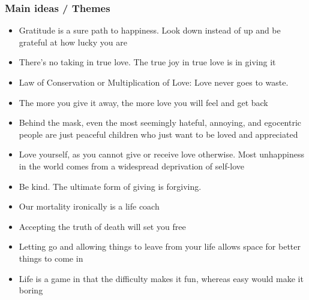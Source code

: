 \begin{frame}[fragile]\frametitle{Main ideas / Themes}

\begin{itemize}
\item Gratitude is a sure path to happiness. Look down instead of up and be grateful at how lucky you are
\item There’s no taking in true love. The true joy in true love is in giving it
\item Law of Conservation or Multiplication of Love: Love never goes to waste. \item The more you give it away, the more love you will feel and get back
\item Behind the mask, even the most seemingly hateful, annoying, and egocentric people are just peaceful children who just want to be loved and appreciated
\item Love yourself, as you cannot give or receive love otherwise. Most unhappiness in the world comes from a widespread deprivation of self-love
\item Be kind. The ultimate form of giving is forgiving.
\item Our mortality ironically is a life coach
\item Accepting the truth of death will set you free
\item Letting go and allowing things to leave from your life allows space for better things to come in
\item Life is a game in that the difficulty makes it fun, whereas easy would make it boring
\end{itemize}

\end{frame}



